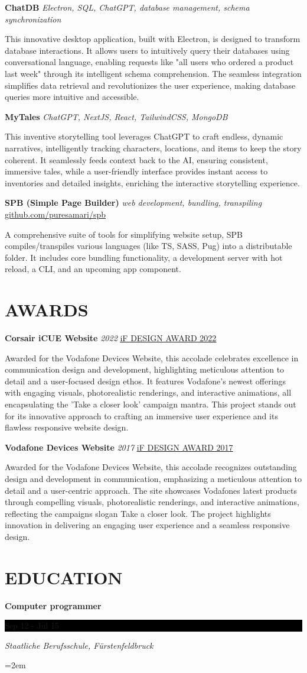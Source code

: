 \documentclass[fontsize=11pt]{article}
\newcommand{\link}[1]{{\color{blue}\underline{\href{#1}{#1}}}}
\newcommand{\maskedLink}[2]{{\color{blue}\underline{\href{#1}{#2}}}}
\newcommand{\sepspace}{\vspace*{1em}}   %
\newcommand{\NewPart}[1]{\section*{\uppercase{#1}}}
\newcommand{\EducationEntry}[4]{
    \noindent \textbf{#1} \hfill      %
    \colorbox{Black}{
      \parbox{8.5em}{
      \hfill\color{White}#2}} \par  %
    \noindent \textit{#3} \par        %
    \noindent\hangindent=2em\hangafter=0 \small #4 %
    \normalsize \par}
\newcommand{\ProjectEntry}[4]{         %
    \noindent \textbf{#1} \noindent \textit{#3} \hfill {#2} \par
    \noindent \small #4 %
    \normalsize \par}
\newcommand{\AwardEntry}[4]{         %
    \noindent \textbf{#1} \noindent \textit{#3} \hfill {#2} \par
    \noindent \small #4 %
    \normalsize \par}
\begin{document}
\sepspace

\ProjectEntry{ChatDB}{}
{Electron, SQL, ChatGPT, database management, schema synchronization}
{This innovative desktop application, built with Electron, is designed to transform database interactions. It allows users to intuitively query their databases using conversational language, enabling requests like "all users who ordered a product last week" through its intelligent schema comprehension. The seamless integration simplifies data retrieval and revolutionizes the user experience, making database queries more intuitive and accessible.}

\sepspace

\ProjectEntry{MyTales}{}
{ChatGPT, NextJS, React, TailwindCSS, MongoDB}
{This inventive storytelling tool leverages ChatGPT to craft endless, dynamic narratives, intelligently tracking characters, locations, and items to keep the story coherent. It seamlessly feeds context back to the AI, ensuring consistent, immersive tales, while a user-friendly interface provides instant access to inventories and detailed insights, enriching the interactive storytelling experience.}

\sepspace

\ProjectEntry{SPB (Simple Page Builder)}{\link{github.com/puresamari/spb}}
{web development, bundling, transpiling}
{A comprehensive suite of tools for simplifying website setup, SPB compiles/transpiles various languages (like TS, SASS, Pug) into a distributable folder. It includes core bundling functionality, a development server with hot reload, a CLI, and an upcoming app component.}

\NewPart{Awards}{}

\AwardEntry{Corsair iCUE Website}{\maskedLink{https://ifdesign.com/en/winner-ranking/project/corsair-icue-website/330779}{iF DESIGN AWARD 2022}}
{2022}
{Awarded for the Vodafone Devices Website, this accolade celebrates excellence in communication design and development, highlighting meticulous attention to detail and a user-focused design ethos. It features Vodafone's newest offerings with engaging visuals, photorealistic renderings, and interactive animations, all encapsulating the 'Take a closer look' campaign mantra. This project stands out for its innovative approach to crafting an immersive user experience and its flawless responsive website design.}

\sepspace

\AwardEntry{Vodafone Devices Website}{\maskedLink{https://ifdesign.com/en/winner-ranking/project/vodafone-devices-website/208757}{iF DESIGN AWARD 2017}}
{2017}
{Awarded for the Vodafone Devices Website, this accolade recognizes outstanding design and development in communication, emphasizing a meticulous attention to detail and a user-centric approach. The site showcases Vodafone\textquotesingle{}s latest products through compelling visuals, photorealistic renderings, and interactive animations, reflecting the campaign\textquotesingle{}s slogan \textquotesingle{}Take a closer look\textquotesingle{}. The project highlights innovation in delivering an engaging user experience and a seamless responsive design.}


\NewPart{Education}{}
\EducationEntry
{Computer programmer}
{Sep 12 - Jul 15}
{Staatliche Berufsschule, Fürstenfeldbruck}

\ 
\end{document}
